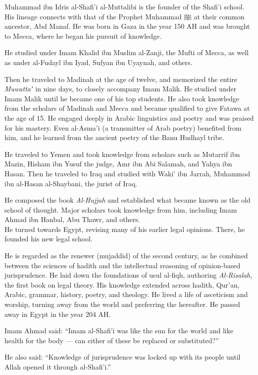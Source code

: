 \documentclass[
  a4paper,
  DIV=11,
  numbers=noendperiod]{scrartcl}
\begin{document}
Muhammad ibn Idris al-Shafi'i al-Muttalibi is the founder of the Shafi'i
school. His lineage connects with that of the Prophet Muhammad ﷺ at
their common ancestor, Abd Manaf. He was born in Gaza in the year 150 AH
and was brought to Mecca, where he began his pursuit of knowledge.

He studied under Imam Khalid ibn Muslim al-Zanji, the Mufti of Mecca, as
well as under al-Fudayl ibn Iyad, Sufyan ibn Uyaynah, and others.

Then he traveled to Madinah at the age of twelve, and memorized the
entire \emph{Muwattaʼ} in nine days, to closely accompany Imam Malik. He
studied under Imam Malik until he became one of his top students. He
also took knowledge from the scholars of Madinah and Mecca and became
qualified to give Fatawa at the age of 15. He engaged deeply in Arabic
linguistics and poetry and was praised for his mastery. Even al-Asma'i
(a transmitter of Arab poetry) benefited from him, and he learned from
the ancient poetry of the Banu Hudhayl tribe.

He traveled to Yemen and took knowledge from scholars such as Mutarrif
ibn Mazin, Hisham ibn Yusuf the judge, Amr ibn Abi Salamah, and Yahya
ibn Hasan. Then he traveled to Iraq and studied with Waki' ibn Jarrah,
Muhammad ibn al-Hasan al-Shaybani, the jurist of Iraq.

He composed the book \emph{Al-Hujjah} and established what became known
as the old school of thought. Major scholars took knowledge from him,
including Imam Ahmad ibn Hanbal, Abu Thawr, and others.\\
He turned towards Egypt, revising many of his earlier legal opinions.
There, he founded his new legal school.

He is regarded as the renewer (mujaddid) of the second century, as he
combined between the sciences of hadith and the intellectual reasoning
of opinion-based jurisprudence. He laid down the foundations of usul
al-fiqh, authoring \emph{Al-Risalah}, the first book on legal theory.
His knowledge extended across hadith, Qur'an, Arabic, grammar, history,
poetry, and theology. He lived a life of asceticism and worship, turning
away from the world and preferring the hereafter. He passed away in
Egypt in the year 204 AH.

Imam Ahmad said: ``Imam al-Shafi'i was like the sun for the world and
like health for the body --- can either of these be replaced or
substituted?''

He also said: ``Knowledge of jurisprudence was locked up with its people
until Allah opened it through al-Shafi'i.''
\end{document}
